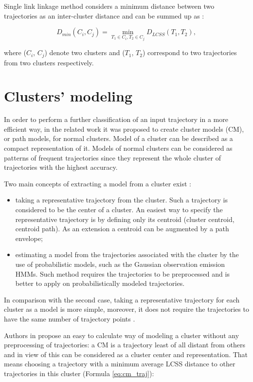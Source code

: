 Single link linkage method considers a minimum distance between two trajectories as an inter-cluster distance and can be summed up as \cite{inproceedings:7_related_work}:

\begin{equation} \label{eq:single_link}
D_{min}(C_i, C_j) = \min_{T_1 \in C_i, T_2 \in C_j} D_{LCSS}(T_1, T_2),
\end{equation} 

where ($C_i$, $C_j$) denote two clusters and ($T_1$, $T_2$) correspond to two trajectories from two clusters respectively.

\section{Clusters' modeling}

In order to perform a further classification of an input trajectory in a more efficient way, in the related work it was proposed to create cluster models (CM), or path models, for normal clusters. Model of a cluster can be described as a compact representation of it. Models of normal clusters can be considered as patterns of frequent trajectories since they represent the whole cluster of trajectories with the highest accuracy. 

Two main concepts of extracting a model from a cluster exist \cite{article:surv_cl_models}: 
\begin{itemize}
	\item taking a representative trajectory from the cluster. Such a trajectory is considered to be the center of a cluster. An easiest way to specify the representative trajectory is by defining only its centroid (cluster centroid, centroid path). As an extension a centroid can be augmented by a path envelope;
	\item estimating a model from the trajectories associated with the cluster by the use of probabilistic models, such as the Gaussian observation emission HMMs. Such method requires the trajectories to be preprocessed and is better to apply on probabilistically modeled trajectories.
\end{itemize}

In comparison with the second case, taking a representative trajectory for each cluster as a model is more simple, moreover, it does not require the trajectories to have the same number of trajectory points \cite{inproceedings:7_related_work}.

Authors in \cite{inproceedings:7_related_work} propose an easy to calculate way of modeling a cluster without any preprocessing of trajectories: a CM is a trajectory least of all distant from others and in view of this can be considered as a cluster center and representation. That means choosing a trajectory with a minimum average LCSS distance to other trajectories in this cluster (Formula \ref{eq:cm_traj}):

